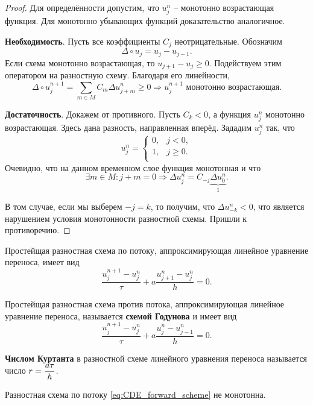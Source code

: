 \documentclass[../main.tex]{subfile}
\begin{document}
\begin{proof}
	Для определённости допустим, что $u_j^n$ -- монотонно возрастающая
	функция. Для монотонно убывающих функций доказательство аналогичное.
	
	\textbf{Необходимость}. Пусть все коэффициенты $C_j$ неотрицательные.
	Обозначим
	\[\Delta\circ u_j=u_j-u_{j-1}.\]
	Если схема монотонно возрастающая, то $u_{j+1}-u_j\ge 0$. Подействуем
	этим оператором на разностную схему. Благодаря его линейности,
	\[\Delta\circ u_j^{n+1}=\sum_{m\in M}C_m\Delta u_{j+m}^{n}\ge 0
	\Rightarrow u_j^{n+1}\text{ монотонно возрастающая}.\]

	\textbf{Достаточность}. Докажем от противного. Пусть $C_k<0$, а функция
	$u_j^n$ монотонно возрастающая. Здесь дана разность, направленная
	вперёд. Зададим $u_j^n$ так, что
	\[
		u_j^n=
		\begin{cases}
			0, & j < 0, \\
			1, & j\ge 0. \\
		\end{cases}
	\]
	Очевидно, что на данном временном слое функция монотонная и что
	\[\exists m\in M:j+m=0\Rightarrow
	\Delta u_j^n=C_{-j}\underset{1}{\underbrace{\Delta u_0^n}}.\]

	В том случае, если мы выберем $-j=k$, то получим, что
	$\Delta u_{-k}^n<0$, что является нарушением условия монотонности
	разностной схемы. Пришли к противоречию.
\end{proof}

\begin{define}\label{eq:CDE_forward_scheme}
	Простейщая разностная схема по потоку, аппроксимирующая линейное
	уравнение переноса, имеет вид
	\[\frac{u_j^{n+1}-u_j^n}{\tau}+a\frac{u_{j+1}^n-u_j^n}{h}=0.\]
\end{define}

\begin{define}\label{eq:godunov_scheme}
	Простейщая разностная схема против потока, аппроксимирующая линейное
	уравнение переноса, называется \textbf{схемой Годунова} и имеет вид
	\[\frac{u_j^{n+1}-u_j^n}{\tau}+a\frac{u_j^n-u_{j-1}^n}{h}=0.\]
\end{define}

\begin{define}
	\textbf{Числом Куртанта} в разностной схеме линейного уравнения переноса
	называется число $\mathlarger{r=\frac{a\tau}{h}}$.
\end{define}

\begin{lemma}
	Разностная схема по потоку \eqref{eq:CDE_forward_scheme} не монотонна.
\end{lemma}
\end{document}
